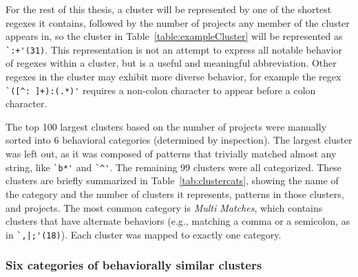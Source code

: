 For the rest of this thesis, a cluster will be represented by one of the shortest regexes it contains, followed by the number of projects any member of the cluster appears in, so the cluster in Table~\ref{table:exampleCluster} will be represented as \verb!`:+'(31)!.  This representation is not an attempt to express all notable behavior of regexes within a cluster, but is a useful and meaningful abbreviation.
Other regexes in the cluster may exhibit more diverse behavior, for example the regex \verb!`([^: ]+):(.*)'! requires a non-colon character to appear before a colon character.




The top 100 largest clusters based on the number of projects were manually sorted into 6 behavioral categories (determined by inspection).  The largest cluster was left out, as it was composed of patterns that trivially matched almost any string, like \verb!`b*'! and \verb!`^'!.  The remaining 99 clusters were all categorized. These clusters are briefly summarized in Table~\ref{tab:clustercats}, showing the name of the category and the number of clusters it represents, patterns in those clusters, and projects. The most common category is \emph{Multi Matches}, which contains clusters that have alternate behaviors (e.g., matching a comma or a semicolon, as in \verb!`,|;'(18)!). Each cluster was mapped to exactly one category.



\subsubsection{Six categories of behaviorally similar clusters}
\label{sec:categoriesDefined}
